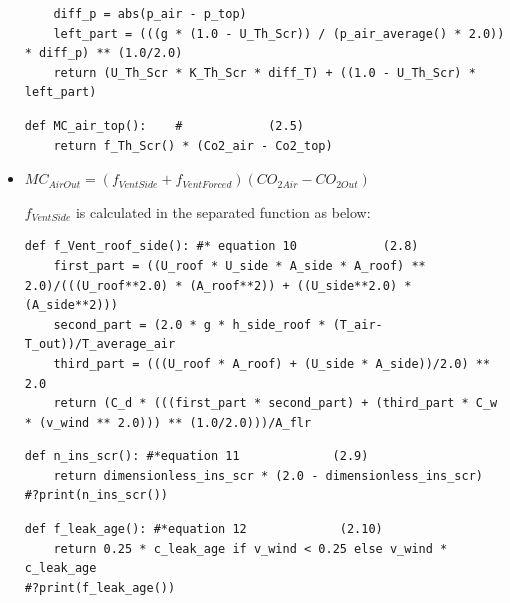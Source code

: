 \documentclass[a4paper]{article}
\numberwithin{equation}{section}
\begin{document}
\begin{itemize}
\begin{mdframed}[leftline=false,rightline=false,backgroundcolor=cyan!10]
\begin{verbatim}
    diff_p = abs(p_air - p_top)
    left_part = (((g * (1.0 - U_Th_Scr)) / (p_air_average() * 2.0)) * diff_p) ** (1.0/2.0)
    return (U_Th_Scr * K_Th_Scr * diff_T) + ((1.0 - U_Th_Scr) * left_part)
  \end{verbatim}
\end{mdframed}
\begin{mdframed}[leftline=false,rightline=false,backgroundcolor=cyan!10]
  \begin{verbatim}
def MC_air_top():    #            (2.5)
    return f_Th_Scr() * (Co2_air - Co2_top)
  \end{verbatim}
\end{mdframed}
\item $ MC_{AirOut} = (f_{VentSide} + f_{VentForced})(CO_{2 Air} - CO_{2 Out})$

\(f_{VentSide}\) is calculated in the separated function as below:
\begin{mdframed}[leftline=false,rightline=false,backgroundcolor=cyan!10]
  \begin{verbatim}
def f_Vent_roof_side(): #* equation 10            (2.8)
    first_part = ((U_roof * U_side * A_side * A_roof) ** 2.0)/(((U_roof**2.0) * (A_roof**2)) + ((U_side**2.0) * (A_side**2)))
    second_part = (2.0 * g * h_side_roof * (T_air-T_out))/T_average_air
    third_part = (((U_roof * A_roof) + (U_side * A_side))/2.0) ** 2.0
    return (C_d * (((first_part * second_part) + (third_part * C_w * (v_wind ** 2.0))) ** (1.0/2.0)))/A_flr
  \end{verbatim}
\end{mdframed}
\begin{mdframed}[leftline=false,rightline=false,backgroundcolor=cyan!10]
  \begin{verbatim}
def n_ins_scr(): #*equation 11             (2.9)
    return dimensionless_ins_scr * (2.0 - dimensionless_ins_scr)
#?print(n_ins_scr())
  \end{verbatim}
\end{mdframed}
\begin{mdframed}[leftline=false,rightline=false,backgroundcolor=cyan!10]
  \begin{verbatim}
def f_leak_age(): #*equation 12             (2.10)
    return 0.25 * c_leak_age if v_wind < 0.25 else v_wind * c_leak_age
#?print(f_leak_age())
  \end{verbatim}
\end{mdframed}


\end{itemize}
\end{document}
